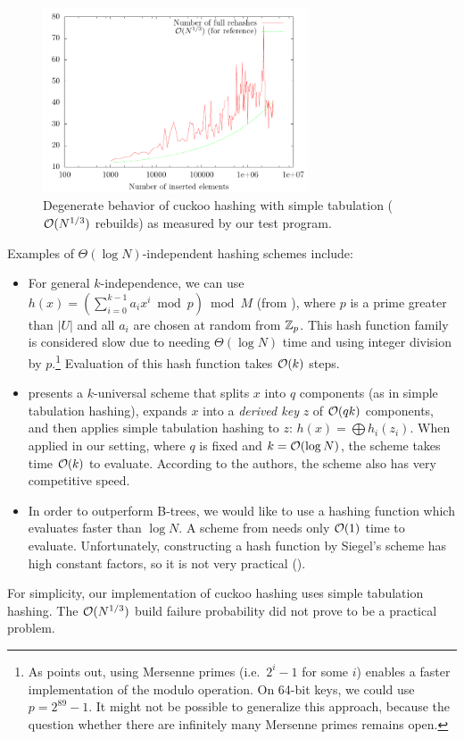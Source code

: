 \begin{figure}
	\centering
	\includegraphics[width=0.7\textwidth]{img/cuckoo/results}
	\caption{Degenerate behavior of cuckoo hashing
		with simple tabulation ($\mathcal{O}(N^{1/3})$ rebuilds)
		as measured by our test program.}
\end{figure}

Examples of $\Theta(\log N)$-independent hashing schemes include:
\begin{itemize}
\item For general $k$-independence, we can use
	$h(x)=(\sum_{i=0}^{k-1} a_i x^i \bmod p) \bmod M$ (from
	\cite{new-hash-fns}), where $p$ is a prime greater than $|U|$ and
	all $a_i$ are chosen at random from $\mathbb{Z}_p$.
	This hash function family is considered slow due to needing
	$\Theta(\log N)$ time and using integer division by $p$.\footnote{
		As \cite{univ-classes} points out, using Mersenne primes
		(i.e.\ $2^i-1$ for some $i$) enables a faster implementation of
		the modulo operation. On 64-bit keys, we could use $p=2^{89}-1$.
		It might not be possible to generalize this approach, because
		the question whether there are infinitely many Mersenne primes
		remains open.
	}
	Evaluation of this hash function takes $\mathcal{O}(k)$ steps.
\item \cite{tab-based-4uni-hashing} presents a $k$-universal scheme that splits
	$x$ into $q$ components (as in simple tabulation hashing),
	expands $x$ into a \emph{derived key} $z$ of $\mathcal{O}(qk)$ components,
	and then applies simple tabulation hashing to $z$:
	$h(x)=\bigoplus h_i(z_i)$.
	When applied in our setting, where $q$ is fixed and $k=\mathcal{O}(\log N)$,
	the scheme takes time $\mathcal{O}(k)$ to evaluate.
	According to the authors, the scheme also has very competitive speed.
\item In order to outperform B-trees, we would like to use a hashing function
	which evaluates faster than $\log N$. A scheme from \cite{siegel-1995}
	needs only $\mathcal{O}(1)$ time to evaluate. Unfortunately, constructing a hash
	function by Siegel's scheme has high constant factors, so it is not
	very practical (\cite{pagh-phd}).
\end{itemize}



For simplicity, our implementation of cuckoo hashing uses simple tabulation
hashing. The $\mathcal{O}(N^{1/3})$ build failure probability did not prove to be a
practical problem.
